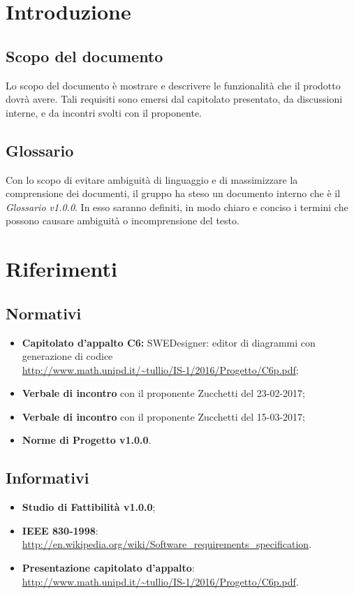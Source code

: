\section{Introduzione}
\subsection{Scopo del documento}
Lo scopo del documento è mostrare e descrivere le funzionalità che il prodotto dovrà avere. Tali requisiti sono emersi dal capitolato presentato, da discussioni interne, e da incontri svolti con il proponente.

\subsection{Glossario}
          Con lo scopo di evitare ambiguità di linguaggio e di massimizzare la comprensione dei documenti, il
          gruppo ha steso un documento interno che è il \emph{Glossario v1.0.0}. In esso saranno definiti, in modo
          chiaro e conciso i termini che possono causare ambiguità o incomprensione del testo.
          
\section{Riferimenti}
\subsection{Normativi}
\begin{itemize}
\item \textbf{Capitolato d'appalto C6:} SWEDesigner: editor di diagrammi  con generazione di codice \\
\url{http://www.math.unipd.it/~tullio/IS-1/2016/Progetto/C6p.pdf};
\item \textbf{Verbale di incontro} con il proponente Zucchetti del 23-02-2017;
\item \textbf{Verbale di incontro} con il proponente Zucchetti del 15-03-2017;
\item \textbf{Norme di Progetto v1.0.0}.
\end{itemize}
\subsection{Informativi}
\begin{itemize}
\item \textbf{Studio di Fattibilità v1.0.0};
\item \textbf{IEEE 830-1998}: \url{http://en.wikipedia.org/wiki/Software_requirements_specification}.
\item \textbf{Presentazione capitolato d'appalto}: \url{http://www.math.unipd.it/~tullio/IS-1/2016/Progetto/C6p.pdf}.
\end{itemize}


